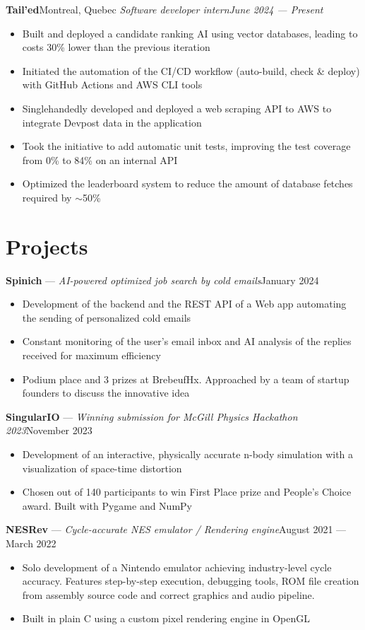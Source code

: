 \documentclass{article}
\newcommand{\newrole}[4]{
    {\normalfont\textbf{#1}\hfill#3}
    \newline
    \textit{#2}\hfill\textit{#4}
}
\newcommand{\shortrole}[3]{
    {\normalfont\textbf{#1} --- \textit{#2}\hfill#3\vspace*{-4pt}}
}
\newenvironment{bulletpoints}{\begin{itemize}\setlength\itemsep{-0.3em}}{\end{itemize}}
\begin{document}
\newrole{Tail'ed}{Software developer intern}{Montreal, Quebec}{June 2024 --- Present}
\begin{bulletpoints}
    \item Built and deployed a candidate ranking AI using vector databases, leading to costs 30\% lower than the previous iteration
    \item Initiated the automation of the CI/CD workflow (auto-build, check \& deploy) with GitHub Actions and AWS CLI tools
    \item Singlehandedly developed and deployed a web scraping API to AWS to integrate Devpost data in the application
    \item Took the initiative to add automatic unit tests, improving the test coverage from 0\% to 84\% on an internal API
    \item Optimized the leaderboard system to reduce the amount of database fetches required by $\sim$50\%
\end{bulletpoints}


\section*{Projects}

\shortrole{Spinich}{AI-powered optimized job search by cold emails}{January 2024}
\begin{bulletpoints}
    \item Development of the backend and the REST API of a Web app automating the sending of personalized cold emails
    \item Constant monitoring of the user's email inbox and AI analysis of the replies received for maximum efficiency
    \item Podium place and 3 prizes at BrebeufHx. Approached by a team of startup founders to discuss the innovative idea 
\end{bulletpoints}

\shortrole{SingularIO}{Winning submission for McGill Physics Hackathon 2023}{November 2023}
\begin{bulletpoints}
    \item Development of an interactive, physically accurate n-body simulation with a visualization of space-time distortion
    \item Chosen out of 140 participants to win First Place prize and People’s Choice award. Built with Pygame and NumPy
\end{bulletpoints}

\shortrole{NESRev}{Cycle-accurate NES emulator / Rendering engine}{August 2021 --- March 2022}
\begin{bulletpoints}
    \item Solo development of a Nintendo emulator achieving industry-level cycle accuracy. Features step-by-step execution, debugging tools, ROM file creation from assembly source code and correct graphics and audio pipeline.
    \item Built in plain C using a custom pixel rendering engine in OpenGL
\end{bulletpoints}
\end{document}
